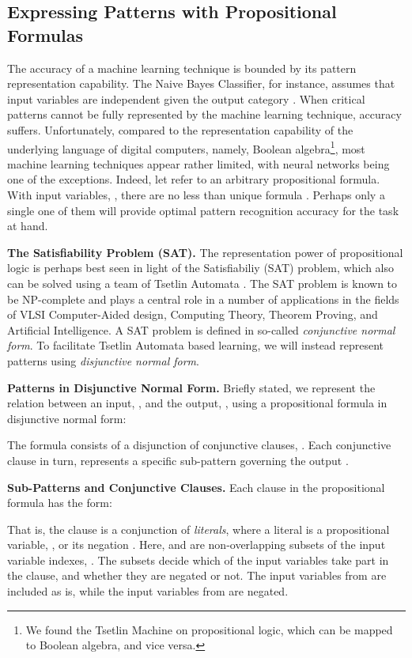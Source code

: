 \documentclass[11pt,a4paper]{article}
\begin{document}
\subsection{Expressing Patterns with Propositional Formulas} 

The accuracy of a machine learning technique is bounded by its pattern representation capability. The Naive Bayes Classifier, for instance, assumes that input variables are independent given the output category \cite{Mitchell1997a}. When critical patterns cannot be fully represented by the machine learning technique, accuracy suffers. Unfortunately, compared to the representation capability of the underlying language of digital computers, namely, Boolean algebra\footnote{We found the Tsetlin Machine on propositional logic, which can be mapped to Boolean algebra, and vice versa.}, most machine learning techniques appear rather limited, with neural networks being one of the exceptions. Indeed, let  refer to an arbitrary propositional formula. With  input variables, , there are no less than  unique formula . Perhaps only a single one of them will provide optimal pattern recognition accuracy for the task at hand.

{\bf The Satisfiability Problem (SAT).} The representation power of propositional logic is perhaps best seen in light of the Satisfiabiliy (SAT) problem, which also can be solved using a team of Tsetlin Automata \cite{Bouhmala2010a}. The SAT problem is known to be NP-complete \cite{Cook1971} and  plays a central role in a number of applications in the fields of VLSI Computer-Aided design, Computing Theory, Theorem Proving, and Artificial Intelligence. A SAT problem is defined in so-called \emph{conjunctive normal form}. To facilitate Tsetlin Automata based learning, we will instead represent patterns using \emph{disjunctive normal form}. 

{\bf Patterns in Disjunctive Normal Form.} Briefly stated, we represent the relation between an input, , and the output, , using a propositional formula  in disjunctive normal form:

The formula consists of a disjunction of  conjunctive clauses, . Each conjunctive clause in turn, represents a specific sub-pattern governing the output .

{\bf Sub-Patterns and Conjunctive Clauses.} Each clause  in the propositional formula  has the form:

That is, the clause is a conjunction of \emph{literals}, where a literal is a propositional variable, , or its negation .
Here,  and  are non-overlapping subsets of the input variable indexes,  . The subsets decide which of the input variables take part in the clause, and whether they are negated or not. The input variables from  are included as is, while the input variables from  are negated.
\end{document}
